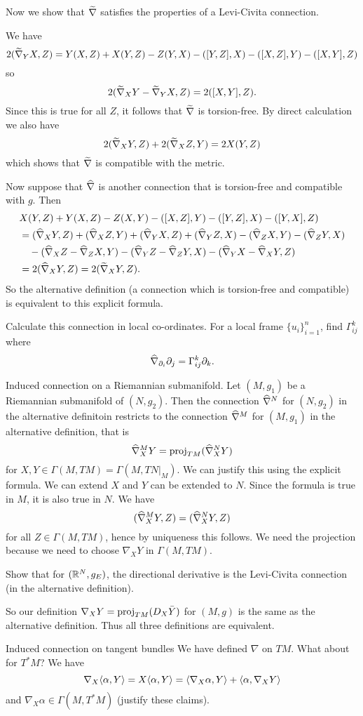 Now we show that $\widetilde\nabla$ satisfies the properties of a Levi-Civita connection.

We have
\[ 2(\widetilde\nabla_YX,Z) = Y(X,Z) + X(Y,Z) - Z(Y,X) - ([Y,Z],X) - ([X,Z],Y) - ([X,Y],Z) \]
so
\[ 2(\widetilde\nabla_XY-\widetilde\nabla_YX,Z) = 2([X,Y],Z). \]
Since this is true for all $Z$, it follows that $\widetilde\nabla$ is torsion-free.
By direct calculation we also have
\[ 2(\widetilde\nabla_XY,Z) + 2(\widetilde\nabla_XZ,Y) = 2X(Y,Z) \]
which shows that $\widetilde\nabla$ is compatible with the metric.

Now suppose that $\widehat\nabla$ is another connection that is torsion-free and compatible with $g$.
Then
\begin{align*}
  &X(Y,Z) + Y(X,Z) - Z(X,Y) - ([X,Z],Y) - ([Y,Z],X) - ([Y,X],Z) \\
  &= (\widehat\nabla_XY,Z) + (\widehat\nabla_XZ,Y) + (\widehat\nabla_YX,Z) + (\widehat\nabla_YZ,X) - (\widehat\nabla_ZX,Y) - (\widehat\nabla_ZY,X) \\
  &\quad - (\widehat\nabla_XZ-\widehat\nabla_ZX,Y) - (\widehat\nabla_YZ-\widehat\nabla_ZY,X) - (\widehat\nabla_YX-\widehat\nabla_XY,Z) \\
  &= 2(\widehat\nabla_XY,Z) = 2(\widetilde\nabla_XY,Z).
\end{align*}
So the alternative definition (a connection which is torsion-free and compatible) is equivalent to this explicit formula.

\begin{exer}
  Calculate this connection in local co-ordinates.
  For a local frame $\{u_i\}_{i=1}^n$, find $\Gamma_{ij}^k$ where
  \[ \widehat\nabla_{\partial_i} \partial_j = \Gamma_{ij}^k\partial_k. \]
\end{exer}

Induced connection on a Riemannian submanifold.
Let $(M,g_1)$ be a Riemannian submanifold of $(N,g_2)$.
Then the connection $\widehat\nabla^N$ for $(N,g_2)$ in the alternative definitoin restricts to the connection $\widehat\nabla^M$ for $(M,g_1)$ in the alternative definition, that is
\[ \widehat\nabla_X^MY = \operatorname{proj}_{TM}(\widehat\nabla_X^NY) \]
for $X,Y\in\Gamma(M,TM)=\Gamma(M,TN|_M)$.
We can justify this using the explicit formula.
We can extend $X$ and $Y$ can be extended to $N$.
Since the formula is true in $M$, it is also true in $N$.
We have
\[ (\widehat\nabla_X^MY,Z) = (\widehat\nabla_X^NY,Z) \]
for all $Z\in\Gamma(M,TM)$, hence by uniqueness this follows.
We need the projection because we need to choose $\nabla_XY$ in $\Gamma(M,TM)$.

\begin{exer}
  Show that for $(\mathbb{R}^N,g_E)$, the directional derivative is the Levi-Civita connection (in the alternative definition).
\end{exer}

So our definition $\nabla_XY=\operatorname{proj}_{TM}(D_X\bar Y)$ for $(M,g)$ is the same as the alternative definition.
Thus all three definitions are equivalent.

Induced connection on tangent bundles
We have defined $\nabla$ on $TM$.
What about for $T^*M$?
We have
\[ \nabla_X{\left\langle \alpha,Y \right\rangle} = X{\left\langle \alpha,Y \right\rangle} = {\left\langle \nabla_X\alpha,Y \right\rangle} + {\left\langle \alpha,\nabla_XY \right\rangle} \]
and $\nabla_X\alpha \in \Gamma(M,T^*M)$ (justify these claims).
